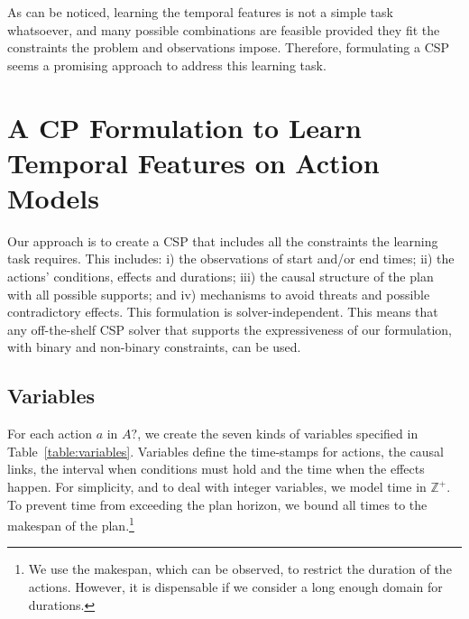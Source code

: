 \documentclass[10pt,journal,compsoc]{IEEEtran}
\begin{document}
As can be noticed, learning the temporal features is not a simple task whatsoever, and many possible combinations are feasible provided they fit the constraints the problem and observations impose. Therefore, formulating a CSP seems a promising approach to address this learning task.


\section{A CP Formulation to Learn Temporal Features on Action Models}
\label{sec:CPformulation}

Our approach is to create a CSP that includes all the constraints the learning task requires. This includes: i) the observations of start and/or end times; ii) the actions' conditions, effects and durations; iii) the causal structure of the plan with all possible supports; and iv) mechanisms to avoid threats and possible contradictory effects. This formulation is solver-independent. This means that any off-the-shelf CSP solver that supports the expressiveness of our formulation, with binary and non-binary constraints, can be used.


\subsection{Variables}


For each action $a$ in $A?$, we create the seven kinds of variables specified in Table~\ref{table:variables}. Variables define the time-stamps for actions, the causal links, the interval when conditions must hold and the time when the effects happen. For simplicity, and to deal with integer variables, we model time in $\mathbb{Z}^+$. To prevent time from exceeding the plan horizon, we bound all times to the makespan of the plan.\footnote{We use the makespan, which can be observed, to restrict the duration of the actions. However, it is dispensable if we consider a long enough domain for durations.}
\end{document}

